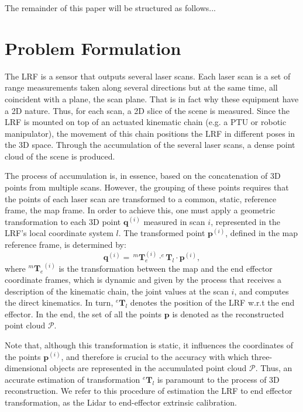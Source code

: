 \documentclass[conference]{IEEEtran}
\begin{document}
The remainder of this paper will be structured as follows...

\section{Problem Formulation}\label{section:problem-formulation}

The LRF is a sensor that outputs several laser scans. Each laser scan is a set of range measurements taken along several directions but at the same time, all coincident with a plane, the scan plane. That is in fact why these equipment have a 2D nature. Thus, for each scan, a 2D slice of the scene is measured. Since the LRF is mounted on top of an actuated kinematic chain (e.g. a PTU or robotic manipulator), the movement of this chain positions the LRF in different poses in the 3D space. Through the accumulation of the several laser scans, a dense point cloud of the scene is produced. 

The process of accumulation is, in essence, based on the concatenation of 3D points from multiple scans. However, the grouping of these points requires that the points of each laser scan are transformed to a common, static, reference frame, the map frame. In order to achieve this, one must apply a geometric transformation to each 3D point $\mathbf{q}^{(i)}$ measured in scan $i$, represented in the LRF's local coordinate system $l$. The transformed point $\mathbf{p}^{(i)}$, defined in the map reference frame, is determined by:
%
\begin{equation}\label{equation:point-reconstruction}
    \mathbf{q}^{(i)} = \, ^{m}\mathbf{T}_{e}^{(i)} \cdot ^{e}\mathbf{T}_{l} \cdot \mathbf{p}^{(i)},
\end{equation}
%
\noindent where ${^{m}\mathbf{T}_{e}}^{(i)}$ is the transformation between the map and the end effector coordinate frames, which is dynamic and given by the process that receives a description of the kinematic chain, the joint values at the scan $i$, and computes the direct kinematics. In turn, $^{e}\mathbf{T}_{l}$ denotes the position of the LRF w.r.t the end effector. In the end, the set of all the points $\mathbf{p}$ is denoted as the reconstructed point cloud $\mathcal{P}$.

Note that, although this transformation is static, it influences the coordinates of the points $\mathbf{p}^{(i)}$, and therefore is crucial to the accuracy with which three-dimensional objects are represented in the accumulated point cloud $\mathcal{P}$.
Thus, an accurate estimation of transformation $^{e}\mathbf{T}_{l}$ is paramount to the process of 3D reconstruction. We refer to this procedure of estimation the LRF to end effector transformation, as the Lidar to end-effector extrinsic calibration.
\end{document}
